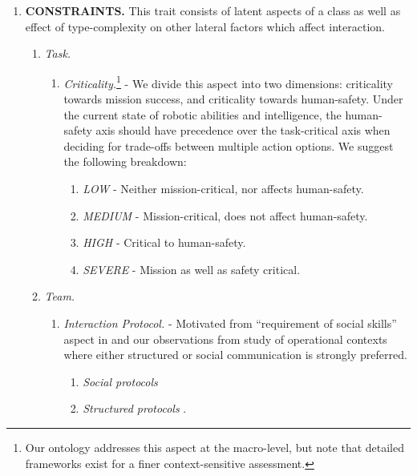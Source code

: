 \documentclass[letterpaper, 10 pt, conference]{ieeeconf}  %
\theoremstyle{definition}
\begin{document}
\begin{enumerate}
\item \textbf{CONSTRAINTS.}
This trait consists of latent aspects of a class as well as effect of type-complexity on other lateral factors which affect interaction.
\begin{enumerate}
    \item \textit{Task.}
        \begin{enumerate}
            \item \textit{Criticality.}\footnote{Our ontology addresses this aspect at the macro-level, but note that detailed frameworks exist \cite{lin2008autonomous} for a finer context-sensitive assessment.} \cite{Beer2014toward, Yanco2004updated} -
            We divide this aspect into two dimensions: criticality towards mission success, and criticality towards human-safety.
            Under the current state of robotic abilities and intelligence, the human-safety axis should have precedence over the task-critical axis when deciding for trade-offs between multiple action options.
            We suggest the following breakdown:
            \begin{enumerate}
                \item \textit{LOW} - Neither mission-critical, nor affects human-safety.
                \item \textit{MEDIUM} - Mission-critical, does not affect human-safety.
                \item \textit{HIGH} - Critical to human-safety.
                \item \textit{SEVERE} - Mission as well as safety critical.
            \end{enumerate}
        \end{enumerate}
    \item \textit{Team.}
        \begin{enumerate}
            \item \textit{Interaction Protocol.} \cite{Dautenhahn} -
            Motivated from ``requirement of social skills'' aspect in \cite{Dautenhahn} and our observations from study of operational contexts where either structured or social communication is strongly preferred.
            \begin{enumerate}
                \item \textit{Social protocols} \cite{Thrun1999Minerva, Burgard1999Mesuem, Cakmak2010, fitzgerald2018human, kidd2006sociable}
                \item \textit{Structured protocols} \cite{sheehan2004military, huckaby2012taxonomic}.

\end{enumerate}
\end{enumerate}
\end{enumerate}
\end{enumerate}
\end{document}
